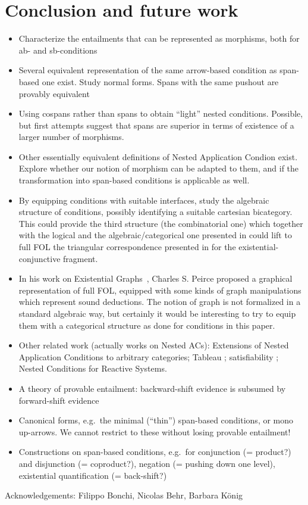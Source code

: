 \section{Conclusion and future work}

\begin{itemize}
    \item Characterize the entailments that can be represented as morphisms, both for ab- and sb-conditions
    \item Several equivalent representation of the same arrow-based condition as span-based one exist. Study normal forms. Spans with the same pushout are provably equivalent
\item Using cospans rather than spans to obtain ``light'' nested conditions. Possible, but first attempts suggest that spans are superior in terms of existence of a larger number of morphisms.
\item Other essentially equivalent definitions of Nested Application Condion exist. Explore whether our notion of morphism can be adapted to them, and if the transformation into span-based conditions is applicable as well.
\item By equipping conditions with suitable interfaces, study the algebraic structure of conditions, possibly identifying a suitable cartesian bicategory. This could provide the third structure (the combinatorial one) which together with the logical and the algebraic/categorical one presented in \cite{DBLP:journals/corr/abs-2404-18795} could lift to full FOL the triangular correspondence presented in \cite{DBLP:conf/csl/BonchiSS18} for the existential-conjunctive fragment.
\item In his work on Existential Graphs~\cite{roberts1973-the-existential-graphs-of-charles-s.-peirce}, Charles S. Peirce proposed a graphical representation of full FOL, equipped with some kinds of graph manipulations which represent sound deductions. The notion of graph is not formalized in a standard algebraic way, but certainly it would be interesting to try to equip them with a categorical structure as done for conditions in this paper.  
\item Other related work (actually works on Nested ACs): Extensions of Nested Application Conditions to arbitrary categories; Tableau%
; satisfiability%
; Nested Conditions for Reactive Systems. 
\item A theory of provable entailment: backward-shift evidence is subsumed by forward-shift evidence
\item Canonical forms, e.g.\ the minimal (``thin'') span-based conditions, or mono up-arrows. We cannot restrict to these without losing provable entailment!
\item Constructions on span-based conditions, e.g.\ for conjunction (= product?) and disjunction (= coproduct?), negation (= pushing down one level), existential quantification (= back-shift?)
\end{itemize}
%
Acknowledgements: Filippo Bonchi, Nicolas Behr, Barbara König
